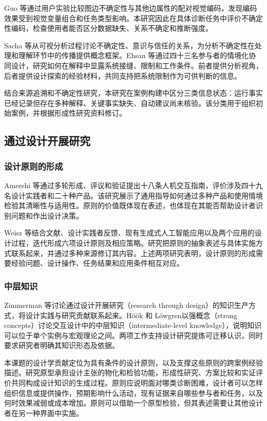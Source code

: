 Guo 等\cite{ref62}通过用户实验比较图边不确定性与其他边属性的配对视觉编码，发现编码效果受到视觉变量组合和任务类型影响。本研究因此在具体诊断任务中评价不确定性编码，检查使用者能否区分数据缺失、关系不确定和推断强度。

Sacha 等\cite{ref39}从可视分析过程讨论不确定性、意识与信任的关系，为分析不确定性在处理和理解环节中的传播提供概念框架。Ehsan 等\cite{ref54}通过四十三名参与者的情境化协同设计，研究如何在解释中显露系统接缝、限制和工作条件。前者提供分析视角，后者提供设计探索的经验材料，共同支持把系统限制作为可供判断的信息。

结合来源追溯和不确定性研究，本研究在案例构建中区分三类信息状态：运行事实已经记录但存在多种解释、关键事实缺失、自动建议尚未核验。该分类用于组织初始案例，并根据形成性研究资料修订。

\subsection{通过设计开展研究}

\subsubsection{设计原则的形成}

Amershi 等\cite{ref48}通过多轮形成、评议和验证提出十八条人机交互指南，评价涉及四十九名设计实践者和二十种产品。该研究展示了通用指导如何通过多种产品和使用情境检验其清晰性与适用性。原则的价值既体现在表述，也体现在其能否帮助设计者识别问题和作出设计决策。

Weisz 等\cite{ref66}结合文献、设计实践者反馈、现有生成式人工智能应用以及两个应用的设计过程，迭代形成六项设计原则及相应策略。研究把原则的抽象表述与具体实施方式联系起来，并通过多种来源修订其内容。上述两项研究表明，设计原则的形成需要经验问题、设计操作、任务结果和应用条件相互对应。

\subsubsection{中层知识}

Zimmerman 等\cite{zimmerman2007rtd}讨论通过设计开展研究（research through design）的知识生产方式，将设计实践与研究贡献联系起来。Höök 和 Löwgren\cite{hook2012strong}以强概念（strong concepts）讨论交互设计中的中层知识（intermediate-level knowledge），说明知识可以位于单个实例与宏观理论之间。两项工作支持设计研究提炼可迁移认识，同时要求研究者明确其知识形态及依据。

本课题的设计学贡献定位为具有条件的设计原则，以及支撑这些原则的跨案例经验描述。研究原型承担设计主张的物化和检验功能，形成性研究、方案比较和实证评价共同构成设计知识的生成过程。原则应说明面对哪类诊断困难，设计者可以怎样组织信息或提供操作，预期影响什么活动，现有证据来自哪些参与者和任务，以及何时效果减弱或成本增加。原则可以借助一个原型检验，但其表述需要让其他设计者在另一种界面中实施。

